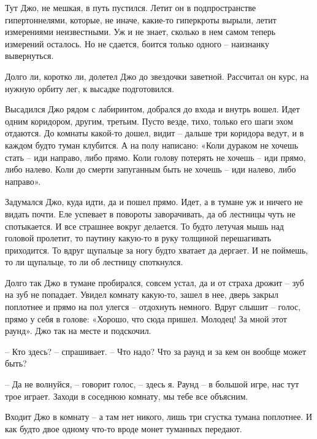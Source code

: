 \documentclass[ebook,oneside,final,openright]{memoir}
\begin{document}
\par
Тут Джо, не мешкая, в путь пустился. Летит он в подпространстве гипертоннелями, которые, не иначе, какие-то гиперкроты вырыли, летит измерениями неизвестными. Уж и не знает, сколько в нем самом теперь измерений осталось. Но не сдается, боится только одного – наизнанку вывернуться.\par
\par
Долго ли, коротко ли, долетел Джо до звездочки заветной. Рассчитал он курс, на нужную орбиту лег, к высадке подготовился.\par
\par
Высадился Джо рядом с лабиринтом, добрался до входа и внутрь вошел. Идет одним коридором, другим, третьим. Пусто везде, тихо, только его шаги эхом отдаются. До комнаты какой-то дошел, видит – дальше три коридора ведут, и в каждом будто туман клубится. А на полу написано: «Коли дураком не хочешь стать – иди направо, либо прямо. Коли голову потерять не хочешь – иди прямо, либо налево. Коли до смерти запуганным быть не хочешь – иди налево, либо направо».\par
\par
Задумался Джо, куда идти, да и пошел прямо. Идет, а в тумане уж и ничего не видать почти. Еле успевает в повороты заворачивать, да об лестницы чуть не спотыкается. И все страшнее вокруг делается. То будто летучая мышь над головой пролетит, то паутину какую-то в руку толщиной перешагивать приходится. То вдруг щупальце за ногу будто хватает да дергает. И не поймешь, то ли щупальце, то ли об лестницу споткнулся.\par
\par
Долго так Джо в тумане пробирался, совсем устал, да и от страха дрожит – зуб на зуб не попадает. Увидел комнату какую-то, зашел в нее, дверь закрыл поплотнее и прямо на пол улегся – отдохнуть немного. Вдруг слышит – голос, прямо у себя в голове: «Хорошо, что сюда пришел. Молодец! За мной этот раунд». Джо так на месте и подскочил. \par
\par
– Кто здесь? – спрашивает. – Что надо? Что за раунд и за кем он вообще может быть?\par
– Да не волнуйся, – говорит голос, – здесь я. Раунд – в большой игре, нас тут трое играет. Заходи в соседнюю комнату, мы тебе все объясним.\par
 \par
Входит Джо в комнату – а там нет никого, лишь три сгустка тумана поплотнее. И как будто двое одному что-то вроде монет туманных передают.\par
\end{document}
